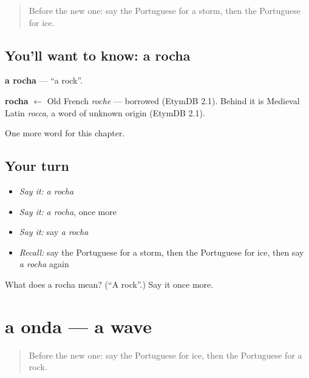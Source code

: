 \label{lesson:PT-C116-rocha}



\begin{quote}
Before the new one: say the Portuguese for a storm, then the Portuguese for ice.
\end{quote}

\subsection*{You'll want to know: a rocha}
\textbf{a rocha} — \textquotedblleft{}a rock\textquotedblright{}.

\begin{cousinweb}
\textbf{rocha} $\leftarrow$ Old French \emph{roche} — borrowed (EtymDB 2.1). Behind it is Medieval Latin \emph{rocca}, a word of unknown origin (EtymDB 2.1).
\end{cousinweb}

\begin{grammarlens}[title={What you've built}]
One more word for this chapter.
\end{grammarlens}

\subsection*{Your turn}
\begin{itemize}
\raggedright
  \item \emph{Say it:} \emph{a rocha}
  \item \emph{Say it:} \emph{a rocha}, once more
  \item \emph{Say it:} say \emph{a rocha}
  \item \emph{Recall:} say the Portuguese for a storm, then the Portuguese for ice, then say \emph{a rocha} again
\end{itemize}

\begin{tcolorbox}[breakable,colback=teal!4,colframe=teal!35!black,title={Before you move on}]
What does a rocha mean? (\textquotedblleft{}A rock\textquotedblright{}.) Say it once more.
\end{tcolorbox}
\section[a onda]{a onda — a wave}

\label{lesson:PT-C116-onda}



\begin{quote}
Before the new one: say the Portuguese for ice, then the Portuguese for a rock.
\end{quote}

